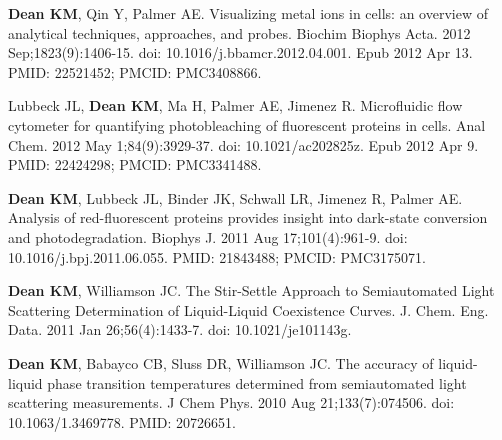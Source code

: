 \begin{etaremune}
\item \textbf{Dean KM}, Qin Y, Palmer AE. Visualizing metal ions in cells: an overview of analytical techniques, approaches, and probes. Biochim Biophys Acta. 2012 Sep;1823(9):1406-15. doi: 10.1016/j.bbamcr.2012.04.001. Epub 2012 Apr 13. PMID: 22521452; PMCID: PMC3408866.

\item Lubbeck JL, \textbf{Dean KM}, Ma H, Palmer AE, Jimenez R. Microfluidic flow cytometer for quantifying photobleaching of fluorescent proteins in cells. Anal Chem. 2012 May 1;84(9):3929-37. doi: 10.1021/ac202825z. Epub 2012 Apr 9. PMID: 22424298; PMCID: PMC3341488.

\item \textbf{Dean KM}, Lubbeck JL, Binder JK, Schwall LR, Jimenez R, Palmer AE. Analysis of red-fluorescent proteins provides insight into dark-state conversion and photodegradation. Biophys J. 2011 Aug 17;101(4):961-9. doi: 10.1016/j.bpj.2011.06.055. PMID: 21843488; PMCID: PMC3175071.

\item \textbf{Dean KM}, Williamson JC. The Stir-Settle Approach to Semiautomated Light Scattering Determination of Liquid-Liquid Coexistence Curves.  J. Chem. Eng. Data.  2011 Jan 26;56(4):1433-7. doi: 10.1021/je101143g.

\item \textbf{Dean KM}, Babayco CB, Sluss DR, Williamson JC. The accuracy of liquid-liquid phase transition temperatures determined from semiautomated light scattering measurements. J Chem Phys. 2010 Aug 21;133(7):074506. doi: 10.1063/1.3469778. PMID: 20726651.

\end{etaremune}